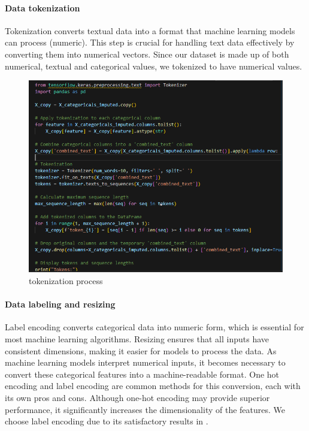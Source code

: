 \paragraph{Data tokenization}
Tokenization converts textual data into a format that machine learning models can process (numeric). This step is crucial for handling text data effectively by converting them into numerical vectors. Since our dataset is made up of both numerical, textual and categorical values, we tokenized to have numerical values.


\begin{figure}[ht!]
    \centering
    \includegraphics[width=0.5\linewidth]{chap3/images/tokenization of categorical data to numeric.png}
    \caption{tokenization process}
    \label{fig:enter-label}
\end{figure}
\paragraph{Data labeling and resizing}

Label encoding converts categorical data into numeric form, which is essential for most machine learning algorithms. Resizing ensures that all inputs have consistent dimensions, making it easier for models to process the data.
As machine learning models interpret numerical inputs, it becomes necessary to convert these categorical features into a machine-readable format. One hot encoding and label encoding are common methods for this conversion, each with its own pros and cons. Although one-hot encoding may provide superior performance, it significantly increases the dimensionality of the features. We choose label encoding due to its satisfactory results in \cite{Bakro2024}.

